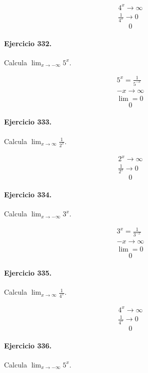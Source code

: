 \documentclass[11pt,a4paper]{article}
\begin{document}
\[
\begin{aligned}
4^x\to\infty\\
\frac{1}{4^x}\to0
\end{aligned}
\]
\[\boxed{0}\]


\paragraph{Ejercicio 332.} Calcula $\displaystyle\lim_{x\to-\infty}5^x$.

\[
\begin{aligned}
5^x=\frac{1}{5^{-x}}\\
-x\to\infty\\
\lim=0
\end{aligned}
\]
\[\boxed{0}\]


\paragraph{Ejercicio 333.} Calcula $\displaystyle\lim_{x\to\infty}\frac{1}{2^x}$.

\[
\begin{aligned}
2^x\to\infty\\
\frac{1}{2^x}\to0
\end{aligned}
\]
\[\boxed{0}\]


\paragraph{Ejercicio 334.} Calcula $\displaystyle\lim_{x\to-\infty}3^x$.

\[
\begin{aligned}
3^x=\frac{1}{3^{-x}}\\
-x\to\infty\\
\lim=0
\end{aligned}
\]
\[\boxed{0}\]


\paragraph{Ejercicio 335.} Calcula $\displaystyle\lim_{x\to\infty}\frac{1}{4^x}$.

\[
\begin{aligned}
4^x\to\infty\\
\frac{1}{4^x}\to0
\end{aligned}
\]
\[\boxed{0}\]


\paragraph{Ejercicio 336.} Calcula $\displaystyle\lim_{x\to-\infty}5^x$.
\end{document}
